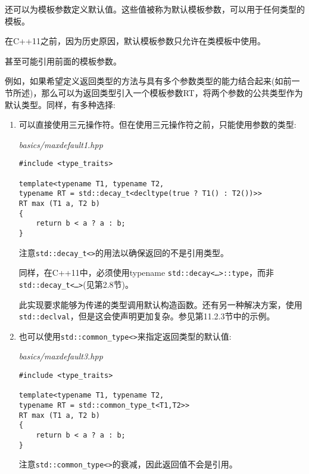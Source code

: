 还可以为模板参数定义默认值。这些值被称为默认模板参数，可以用于任何类型的模板。

\begin{tcolorbox}[colback=webgreen!5!white,colframe=webgreen!75!black]
\hspace*{0.75cm}在C++11之前，因为历史原因，默认模板参数只允许在类模板中使用。
\end{tcolorbox}

甚至可能引用前面的模板参数。

例如，如果希望定义返回类型的方法与具有多个参数类型的能力结合起来(如前一节所述)，那么可以为返回类型引入一个模板参数RT，将两个参数的公共类型作为默认类型。同样，有多种选择:

\begin{enumerate}
\item 
可以直接使用三元操作符。但在使用三元操作符之前，只能使用参数的类型:

\noindent
\textit{basics/maxdefault1.hpp}
\begin{lstlisting}[style=styleCXX]
#include <type_traits>

template<typename T1, typename T2,
typename RT = std::decay_t<decltype(true ? T1() : T2())>>
RT max (T1 a, T2 b)
{
	return b < a ? a : b;
}
\end{lstlisting}

注意\texttt{std::decay\_t<>}的用法以确保返回的不是引用类型。

\begin{tcolorbox}[colback=webgreen!5!white,colframe=webgreen!75!black]
\hspace*{0.75cm}同样，在C++11中，必须使用typename \texttt{std::decay<…>::type}，而非\texttt{std::decay\_t<…>}(见第2.8节)。
\end{tcolorbox}

此实现要求能够为传递的类型调用默认构造函数。还有另一种解决方案，使用\texttt{std::declval}，但是这会使声明更加复杂。参见第11.2.3节中的示例。

\item
也可以使用\texttt{std::common\_type<>}来指定返回类型的默认值:

\noindent
\textit{basics/maxdefault3.hpp}
\begin{lstlisting}[style=styleCXX]
#include <type_traits>

template<typename T1, typename T2,
typename RT = std::common_type_t<T1,T2>>
RT max (T1 a, T2 b)
{
	return b < a ? a : b;
}
\end{lstlisting}

注意\texttt{std::common\_type<>}的衰减，因此返回值不会是引用。
\end{enumerate}

